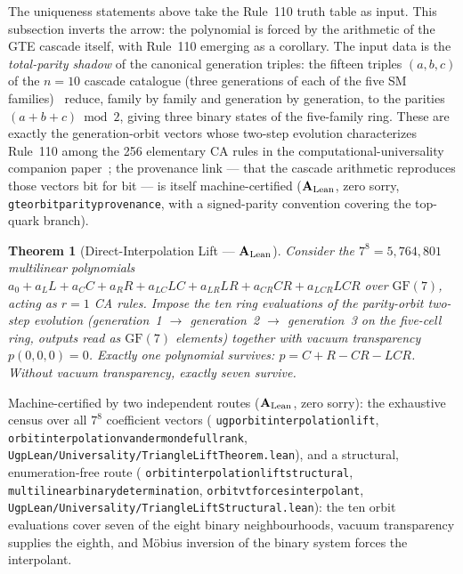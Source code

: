 \documentclass[11pt]{article}
\newtheorem{theorem}{Theorem}[section]
\theoremstyle{remark}
\newcommand{\GF}[1]{\ensuremath{\mathrm{GF}(#1)}}
\newcommand{\lean}[1]{%
  \penalty-100
  \begingroup\def\_{\textunderscore\allowbreak}\texttt{#1}\endgroup}
\newcommand{\CatAL}{\texorpdfstring{\ensuremath{\textbf{A}_{\rm Lean}}}{A-Lean}}
\begin{document}
The uniqueness statements above take the Rule~110 truth table as input.
This subsection inverts the arrow: the polynomial is forced by the
arithmetic of the GTE cascade itself, with Rule~110 emerging as a
corollary. The input data is the \emph{total-parity shadow} of the
canonical generation triples: the fifteen triples $(a,b,c)$ of the
$n = 10$ cascade catalogue (three generations of each of the five SM
families)~\cite{SpivackGTEMobius,SpivackCMCA} reduce, family by family
and generation by generation, to the parities $(a+b+c) \bmod 2$, giving
three binary states of the five-family ring. These are exactly the
generation-orbit vectors whose two-step evolution characterizes Rule~110
among the 256 elementary CA rules in the computational-universality
companion paper~\cite{SpivackCompUniversality}; the provenance link ---
that the cascade arithmetic reproduces those vectors bit for bit --- is
itself machine-certified (\CatAL{}, zero sorry,
\lean{gte\_orbit\_parity\_provenance}, with a signed-parity convention
covering the top-quark branch).

\begin{theorem}[Direct-Interpolation Lift --- \CatAL{}]
\label{thm:lift}
Consider the $7^{8} = 5{,}764{,}801$ multilinear polynomials
$a_0 + a_L L + a_C C + a_R R + a_{LC} LC + a_{LR} LR + a_{CR} CR +
a_{LCR} LCR$ over $\GF{7}$, acting as $r = 1$ CA rules. Impose the ten
ring evaluations of the parity-orbit two-step evolution (generation~1
$\to$ generation~2 $\to$ generation~3 on the five-cell ring, outputs read
as $\GF{7}$ elements) together with vacuum transparency $p(0,0,0) = 0$.
Exactly one polynomial survives: $p = C+R-CR-LCR$. Without vacuum
transparency, exactly seven survive.
\end{theorem}

{\sloppy\noindent Machine-certified by two independent routes (\CatAL{},
zero sorry): the exhaustive census over all $7^{8}$ coefficient vectors
(\lean{ugp\_orbit\_interpolation\_lift},
\lean{orbit\_interpolation\_vandermonde\_full\_rank},
\lean{UgpLean/Universality/TriangleLiftTheorem.lean}), and a structural,
enumeration-free route
(\lean{orbit\_interpolation\_lift\_structural},
\lean{multilinear\_binary\_determination},
\lean{orbit\_vt\_forces\_interpolant},
\lean{UgpLean/Universality/TriangleLiftStructural.lean}): the ten orbit
evaluations cover seven of the eight binary neighbourhoods, vacuum
transparency supplies the eighth, and M\"obius inversion of the binary
system forces the interpolant.\par}
\end{document}
